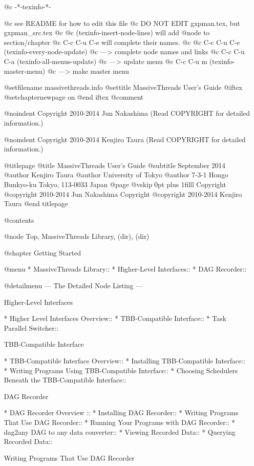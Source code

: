   @c -*-texinfo-*-

@c see README for how to edit this file
@c DO NOT EDIT gxpman.tex, but gxpman_src.tex
@c
@c (texinfo-insert-node-lines) will add @node to section/chapter
@c C-c C-u C-e will complete their names.
@c 
@c C-c C-u C-e  (texinfo-every-node-update) 
@c    ---> complete node names and links
@c C-c C-u C-a  (texinfo-all-menus-update)  
@c    ---> update menu
@c C-c C-u m    (texinfo-master-menu) 
@c    ---> make master menu

@setfilename massivethreads.info
@settitle MassiveThreads User's Guide
@iftex
@setchapternewpage on
@end iftex
@comment %


@noindent Copyright 2010-2014 Jun Nakashima (Read COPYRIGHT for detailed information.)

@noindent Copyright 2010-2014 Kenjiro Taura (Read COPYRIGHT for detailed information.)

@titlepage
@title MassiveThreads User's Guide
@subtitle September 2014
@author Kenjiro Taura
@author University of Tokyo
@author 7-3-1 Hongo Bunkyo-ku Tokyo, 113-0033 Japan
@page
@vskip 0pt plus 1filll
Copyright @copyright{} 2010-2014 Jun Nakashima
Copyright @copyright{} 2010-2014 Kenjiro Taura
@end titlepage

@contents

@node Top, MassiveThreads Library, (dir), (dir)

@chapter Getting Started

@menu
* MassiveThreads Library::
* Higher-Level Interfaces::
* DAG Recorder::

@detailmenu
 --- The Detailed Node Listing ---

Higher-Level Interfaces

* Higher Level Interfaces Overview::
* TBB-Compatible Interface::
* Task Parallel Switcher::

TBB-Compatible Interface

* TBB-Compatible Interface Overview::
* Installing TBB-Compatible Interface::
* Writing Programs Using TBB-Compatible Interface::
* Choosing Schedulers Beneath the TBB-Compatible Interface::

DAG Recorder

* DAG Recorder Overview ::
* Installing DAG Recorder::
* Writing Programs That Use DAG Recorder::
* Running Your Programs with DAG Recorder::
* dag2any DAG to any data converter::
* Viewing Recorded Data::
* Querying Recorded Data::

Writing Programs That Use DAG Recorder

